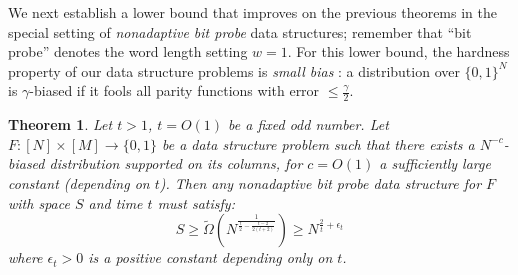 \documentclass[11pt]{article}
\newtheorem{theorem}{Theorem}
\newcommand{\B}{\{0,1\}}
\newcommand{\N}{[N]}
\begin{document}
We next establish a lower bound that improves on the previous theorems in the special setting of \emph{nonadaptive bit probe} data structures; remember that ``bit probe'' denotes the word length setting $w= 1$. For this lower bound, the hardness property of our data structure problems is \emph{small bias} \cite{naornaor}: a distribution over $\B^N$ is $\gamma$-biased if it fools all parity functions with error $\leq \frac{\gamma}{2}$.
\begin{theorem}
\label{thm:biased-lb}
Let $t>1$, $t = O(1)$ be a fixed odd number.  Let $F:\N \times [M] \to \B$ be a data structure problem such that there exists a $N^{-c}$-biased distribution supported on its columns, for $c=O(1)$ a sufficiently large constant (depending on $t$). Then any nonadaptive bit probe data structure for $F$ with space $S$ and time $t$ must satisfy:
\[
S \geq \tilde{\Omega}(N^{\frac{1}{\frac{t}{2} -\frac{t- 2}{2(t+2)}}})  \geq N^{\frac{2}{t} + \epsilon_t}
\]
where $\epsilon_t > 0$ is a positive constant depending only on $t$.
\end{theorem}
\end{document}
